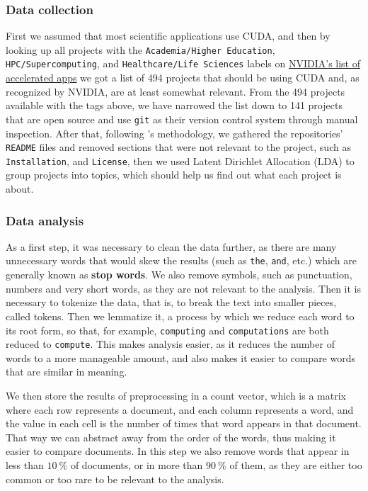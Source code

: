 \documentclass[conference, onecolumn]{IEEEtran}
\begin{document}
\subsubsection{Data collection} \label{sec:methodology:statistics-data}

First we assumed that most scientific applications use CUDA, and then by
looking up all projects with the \verb|Academia/Higher Education|,
\verb|HPC/Supercomputing|, and \verb|Healthcare/Life Sciences| labels on
\href{https://nvidia.com/en-us/gpu-accelerated-applications}{NVIDIA's list of accelerated apps}
we got a list of 494 projects that should be using CUDA and, as recognized by
NVIDIA, are at least somewhat relevant.
From the 494 projects available with the tags above, we have narrowed the list
down to 141 projects that are open source and use \verb|git| as their version
control system through manual inspection.
After that, following \cite{zheng2018measuring}'s methodology, we gathered the
repositories' \verb|README| files and removed sections that were not relevant to
the project, such as \verb|Installation|, and \verb|License|, then we used
Latent Dirichlet Allocation (LDA) to group projects into topics, which should
help us find out what each project is about.

\subsubsection{Data analysis} \label{sec:methodology:statistics-analysis}

As a first step, it was necessary to clean the data further, as there are many
unnecessary words that would skew the results (such as \verb|the|, \verb|and|,
etc.) which are generally known as \textbf{stop words}.
We also remove symbols, such as punctuation, numbers and very short words, as
they are not relevant to the analysis.
Then it is necessary to tokenize the data, that is, to break the text into
smaller pieces, called tokens.
Then we lemmatize it, a process by which we reduce each word to its root form,
so that, for example, \verb|computing| and \verb|computations| are both reduced
to \verb|compute|.
This makes analysis easier, as it reduces the number of words to a more
manageable amount, and also makes it easier to compare words that are similar
in meaning.

We then store the results of preprocessing in a count vector, which is a matrix
where each row represents a document, and each column represents a word, and
the value in each cell is the number of times that word appears in that
document.
That way we can abstract away from the order of the words, thus making it
easier to compare documents.
In this step we also remove words that appear in less than $\qty{10}{\percent}$
of documents, or in more than $\qty{90}{\percent}$ of them, as they are either
too common or too rare to be relevant to the analysis.
\end{document}
